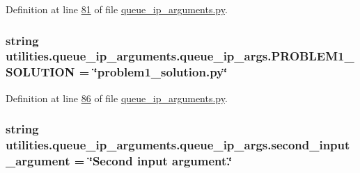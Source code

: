 Definition at line \hyperlink{queue__ip__arguments_8py_source_l00081}{81} of file \hyperlink{queue__ip__arguments_8py_source}{queue\+\_\+ip\+\_\+arguments.\+py}.

\hypertarget{classutilities_1_1queue__ip__arguments_1_1queue__ip__args_ad61d6e7f7e2602c0f1c11a8fdf2b7168}{}
\subsubsection[{P\+R\+O\+B\+L\+E\+M1\+\_\+\+S\+O\+L\+U\+T\+I\+O\+N}]{\setlength{\rightskip}{0pt plus 5cm}string utilities.\+queue\+\_\+ip\+\_\+arguments.\+queue\+\_\+ip\+\_\+args.\+P\+R\+O\+B\+L\+E\+M1\+\_\+\+S\+O\+L\+U\+T\+I\+O\+N = \char`\"{}problem1\+\_\+solution.\+py\char`\"{}\hspace{0.3cm}{\ttfamily [static]}}\label{classutilities_1_1queue__ip__arguments_1_1queue__ip__args_ad61d6e7f7e2602c0f1c11a8fdf2b7168}


Definition at line \hyperlink{queue__ip__arguments_8py_source_l00086}{86} of file \hyperlink{queue__ip__arguments_8py_source}{queue\+\_\+ip\+\_\+arguments.\+py}.

\hypertarget{classutilities_1_1queue__ip__arguments_1_1queue__ip__args_a0b179a70c0e57de2794d0d532e534c9c}{}
\subsubsection[{second\+\_\+input\+\_\+argument}]{\setlength{\rightskip}{0pt plus 5cm}string utilities.\+queue\+\_\+ip\+\_\+arguments.\+queue\+\_\+ip\+\_\+args.\+second\+\_\+input\+\_\+argument = \char`\"{}Second input argument.\char`\"{}\hspace{0.3cm}{\ttfamily [static]}}\label{classutilities_1_1queue__ip__arguments_1_1queue__ip__args_a0b179a70c0e57de2794d0d532e534c9c}


